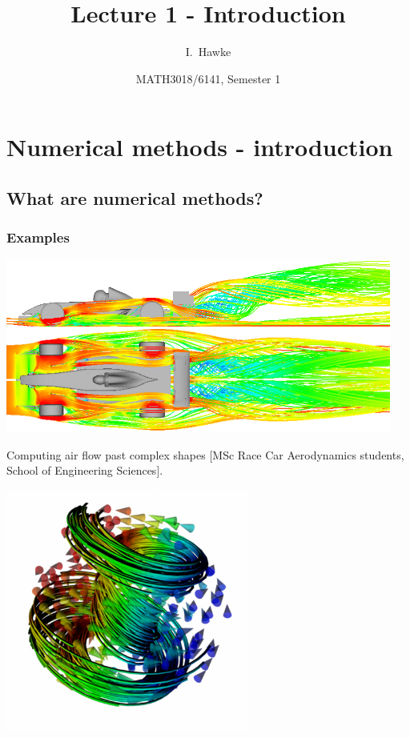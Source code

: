 \documentclass{beamer}
\title[Lecture 1]{Lecture 1 - Introduction}
\author[I. Hawke]{I.~Hawke}
\institute[University of Southampton]
{
  School of Mathematics, \\
  University of Southampton, UK
}
\date[Semester 1]{MATH3018/6141, Semester 1}
\begin{document}
\begin{frame}
  \titlepage
\end{frame}

\section{Numerical methods - introduction}

\subsection{What are numerical methods?}

\begin{frame}
  \frametitle{Examples}

  \begin{overlayarea}{\textwidth}{0.8\textheight}
    {
      \begin{center}

        \vspace{2ex}
        \includegraphics[width=0.95\textwidth]{figures/Kenji_Glue_Crop3}
        \vspace{3ex}

        Computing air flow past complex shapes {\tiny [MSc Race Car
          Aerodynamics students, School of Engineering Sciences]}.
      \end{center}
    }
    {
      \begin{center}
        \includegraphics[width=0.6\textwidth]{figures/0mT_zeeman_Fangohr_Ferromagnetic_Sphere}


\end{center}}
\end{overlayarea}
\end{frame}
\end{document}
